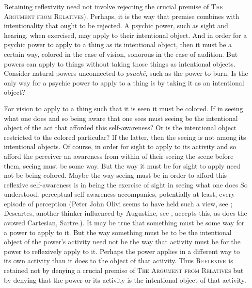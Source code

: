 Retaining reflexivity need not involve rejecting the crucial premise of \textsc{The Argument from Relatives}). Perhaps, it is the way that premise combines with intentionality that ought to be rejected. A psychic power, such as sight and hearing, when exercised, may apply to their intentional object. And in order for a psychic power to apply to a thing as its intentional object, then it must be a certain way, colored in the case of vision, sonorous in the case of audition. But powers can apply to things without taking those things as intentional objects. Consider natural powers unconnected to \emph{psuchē}, such as the power to burn. Is the only way for a psychic power to apply to a thing is by taking it as an intentional object?

For vision to apply to a thing such that it is seen it must be colored. If in seeing what one does and so being aware that one sees must seeing be the intentional object of the act that afforded this self-awareness? Or is the intentional object restricted to the colored particular? If the latter, then the seeing is not among its intentional objects. Of course, in order for sight to apply to its activity and so afford the perceiver an awareness from within of their seeing the scene before them, seeing must be some way. But the way it must be for sight to apply need not be being colored. Maybe the way seeing must be in order to afford this reflexive self-awareness is in being the exercise of sight in seeing what one does So understood, perceptual self-awareness accompanies, potentially at least, every episode of perception (Peter John Olivi seems to have held such a view, see \citealt{Brower-Toland:2024qa}; Descartes, another thinker influenced by Augustine, see \citealt{Menn:1998nr}, accepts this, as does the avowed Cartesian, Sartre.). It may be true that something must be some way for a power to apply to it. But the way something must be to be the intentional object of the power's activity need not be the way that activity must be for the power to reflexively apply to it. Perhaps the power applies in a different way to its own activity than it does to the object of that activity. Thus \textsc{Reflexive} is retained not by denying a crucial premise of \textsc{The Argument from Relatives} but by denying that the power or its activity is the intentional object of that activity.


